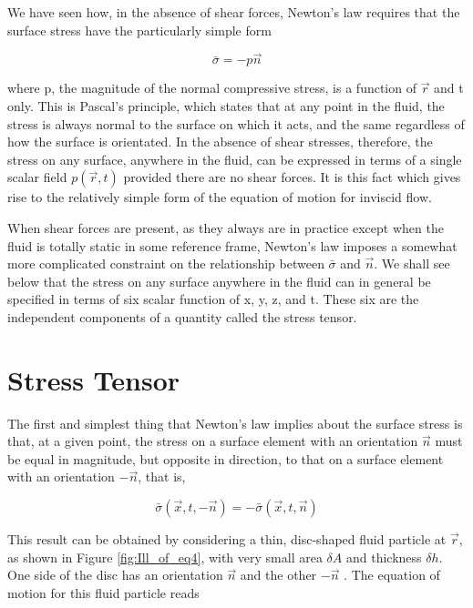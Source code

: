 \documentclass{article}
\begin{document}
{We have seen how, in the absence of shear forces, Newton's law requires that the surface stress have the particularly simple form

$$\bar{\sigma} = -p\overrightarrow{n}$$

where p, the magnitude of the normal compressive stress, is a function of $\overrightarrow{r}$ and t only. This is Pascal's principle, which states that at any point in the fluid, the stress is always normal to the surface on which it acts, and the same regardless of how the surface is
orientated. In the absence of shear stresses, therefore, the stress on any surface, anywhere
in the fluid, can be expressed in terms of a single scalar field $p(\overrightarrow{r},t)$ provided there are no shear forces. It is this fact which gives rise to the relatively simple form of the equation of motion for inviscid flow.

When shear forces are present, as they always are in practice except when the fluid is totally static in some reference frame, Newton's law imposes a somewhat more complicated constraint on the relationship between $\bar{\sigma}$ and $\overrightarrow{n}$. We shall see below that the
stress on any surface anywhere in the fluid can in general be specified in terms of six
scalar function of x, y, z, and t. These six are the independent components of a quantity
called the stress tensor.

\section*{Stress Tensor}

The first and simplest thing that Newton's law implies about the surface stress is that, at a given point, the stress on a surface element with an orientation $\overrightarrow{n}$ must be equal in magnitude, but opposite in direction, to that on a surface element with an orientation $-\overrightarrow{n}$, that is,

\begin{equation}
\bar{\sigma}(\overrightarrow{x},t,-\overrightarrow{n}) = -\bar{\sigma}(\overrightarrow{x},t,\overrightarrow{n}) \label{e4}
\end{equation}


This result can be obtained by considering a thin, disc-shaped fluid particle at $\overrightarrow{r}$, as shown in Figure \ref{fig:Ill_of_eq4}, with very small area $\delta A$ and thickness $\delta h$. One
side of the disc has an orientation $\overrightarrow{n}$ and the other $-\overrightarrow{n}$ . The equation of motion for this fluid particle reads

}
\end{document}
